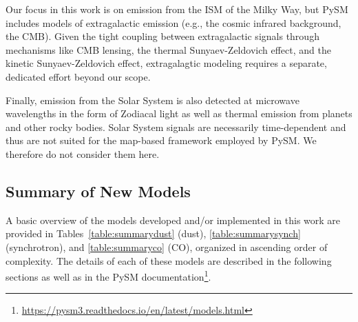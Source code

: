 \documentclass[twocolumn]{aastex631}
\begin{document}
Our focus in this work is on emission from the ISM of the Milky Way, but PySM includes models of extragalactic emission (e.g., the cosmic infrared background, the CMB). Given the tight coupling between extragalactic signals through mechanisms like CMB lensing, the thermal Sunyaev-Zeldovich effect, and the kinetic Sunyaev-Zeldovich effect, extragalagtic modeling requires a separate, dedicated effort beyond our scope.

Finally, emission from the Solar System is also detected at microwave wavelengths in the form of Zodiacal light as well as thermal emission from planets and other rocky bodies. Solar System signals are necessarily time-dependent and thus are not suited for the map-based framework employed by PySM. We therefore do not consider them here.

\subsection{Summary of New Models}
A basic overview of the models developed and/or implemented in this work are provided in Tables~\ref{table:summarydust} (dust), \ref{table:summarysynch} (synchrotron), and \ref{table:summaryco} (CO), organized in ascending order of complexity. The details of each of these models are described in the following sections as well as in the PySM documentation\footnote{\url{https://pysm3.readthedocs.io/en/latest/models.html}}.
\end{document}
